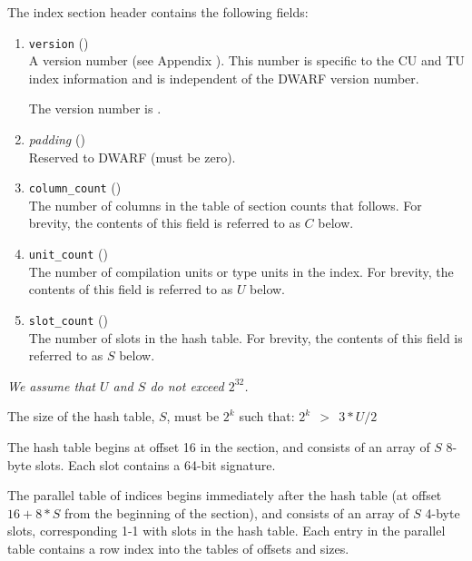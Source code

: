 The index section header contains the following fields:
\begin{enumerate}[1. ]
\item \texttt{version} (\HFTuhalf) \\
A version number
(see Appendix ). 
This number is specific to the CU and TU index information
and is independent of the DWARF version number.

The version number is \versiondotdebugcuindex.

\item \textit{padding} (\HFTuhalf) \\
Reserved to DWARF (must be zero).

\item \texttt{column\_count} (\HFTuword) \\
The number of columns in the table of section counts that follows.
For brevity, the contents of this field is referred to as $C$ below.

\item \texttt{unit\_count} (\HFTuword) \\
The number of compilation units or type units in the index.
For brevity, the contents of this field is referred to as $U$ below.

\item \texttt{slot\_count} (\HFTuword) \\
The number of slots in the hash table.
For brevity, the contents of this field is referred to as $S$ below.

\end{enumerate}

\textit{We assume that $U$ and $S$ do not exceed $2^{32}$.}

The size of the hash table, $S$, must be $2^k$ such that:
\hspace{0.3cm}$2^k\ \ >\ \ 3*U/2$

The hash table begins at offset 16 in the section, and consists
of an array of $S$ 8-byte slots. Each slot contains a 64-bit
signature.

The parallel table of indices begins immediately after the hash table 
(at offset \mbox{$16 + 8 * S$} from the beginning of the section), and
consists of an array of $S$ 4-byte slots,
corresponding 1-1 with slots in the hash
table. Each entry in the parallel table contains a row index into
the tables of offsets and sizes.

